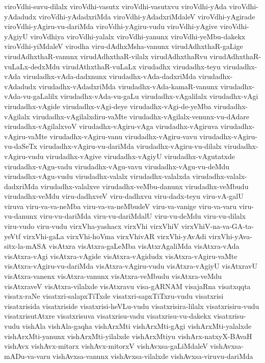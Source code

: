 {viroVdhi-suvu-dilalx
viroVdhi-vasutx
viroVdhi-vasutxvu
viroVdhi-yAda
viroVdhi-yAdadudx
viroVdhi-yAdadxriMda
viroVdhi-yAdadxriMdaleV
viroVdhi-yAgirade
viroVdhi-yAgiru-vu-dariMda
viroVdhi-yAgiru-vudu
viroVdhi-yAgive
viroVdhi-yAgiyU
viroVdhiya
viroVdhi-yalalx
viroVdhi-yanunx
viroVdhi-yeMbu-dakekx
viroVdhi-yiMdaleV
virodha
viru-dAdhxMsha-vanunx
virudAdhxthaR-gaLige
virudAdhxthaR-vanunx
virudAdhxthaR-vilalx
virudAdhxthaRvu
virudAdhxthaR-vuLaLx-dedxMdu
virudAthxthaR-vuLaLx
virudadhx
virudadhx-teyu
virudadhx-vAda
virudadhx-vAda-dadxnunx
virudadhx-vAda-dadxriMda
virudadhx-vAdadudx
virudadhx-vAdadxriMda
virudadhx-vAda-kamaR-vanunx
virudadhx-vAda-vu-gaLalilx
virudadhx-vAda-vu-gaLu
virudadhx-vAgalilalx
virudadhx-vAgi
virudadhx-vAgide
virudadhx-vAgi-deye
virudadhx-vAgi-de-yeMba
virudadhx-vAgilalx
virudadhx-vAgilalxdiru-vaMte
virudadhx-vAgilalx-venunx-vu-dAdare
virudadhx-vAgilalxvoV
virudadhx-vAgiru-vAga
virudadhx-vAgiruva
virudadhx-vAgiru-vaMte
virudadhx-vAgiru-vanu
virudadhx-vAgiru-vavu
virudadhx-vAgiru-vu-daSeTx
virudadhx-vAgiru-vu-dariMda
virudadhx-vAgiru-vu-dilalx
virudadhx-vAgiru-vudu
virudadhx-vAgive
virudadhx-vAgiyU
virudadhx-vAgutatxde
virudadhx-vAgu-vadu
virudadhx-vAgu-vavu
virudadhx-vAgu-vu-deMdu
virudadhx-vAgu-vudu
virudadhx-valalx
virudadhx-valalxda
virudadhx-valalx-dadxriMda
virudadhx-valalxve
virudadhx-veMbu-danunx
virudadhx-veMbudu
virudadhx-veMdu
viru-dadhxveV
viru-dadhxvu
viru-dadx-teyu
viru-vA-galU
viruva
viru-va-va-neMba
viru-va-va-neMbudeV
viru-va-vanige
viru-va-varu
viru-vu-danunx
viru-vu-dariMda
viru-vu-dariMdalU
viru-vu-deMdu
viru-vu-dilalx
viru-vudo
viru-vudu
virxVha-yashacx
virxVhi
virxVhiV
virxVhiV-na-va-GA-ta-yeVtf
virxVhi-gaLa
virxVhi-hoVma
virxVhivAR
virxVhi-yAvAdi
virxVhi-yAva-sitx-la-mASA
visAtxra
visAtxra-gaLeMba
visAtxrAgaliMda
visAtxra-vAda
visAtxra-vAgi
visAtxra-vAgide
visAtxra-vAgidudx
visAtxra-vAgiru-vaMte
visAtxra-vAgiru-vu-dariMda
visAtxra-vAgiru-vudu
visAtxra-vAgiyU
visAtxravU
visAtxra-vanenx
visAtxra-vanunx
visAtxra-veMbudu
visAtxra-veMdu
visAtxraveV
visAtxra-vilalxde
visAtxravu
visa-gARNAM
visajaRna
visatxqqta
visatx-raNe
visatxri-salapxTiTxde
visatxri-sapxTiTxru-vudu
visatxrisi
visatxrisida
visatxriside
visatxrisi-heVLu-vudu
visatxrisira-lilalx
visatxrisiru-vudu
visatxrisutAtxre
visatxrisuva
visatxrisu-vadu
visatxrisu-vu-dakekx
visatxrisu-vudu
vishAla
vishAla-gaqha
vishArxMti
vishArxMti-gAgi
vishArxMti-yalalxde
vishArxMti-yanunx
vishArxMti-yilalxde
vishArxMtiyu
vishArx-natxyX-BAvaH
vishAvx
vishAvx-mitarx
vishAvx-mitorxV
vishAvxsa-gaLiMdaleV
vishAvxsa-mADu-va-varu
vishAvxsa-vanunx
vishAvxsa-vilalxde
vishAvxsa-viruvu-dariMda
}
